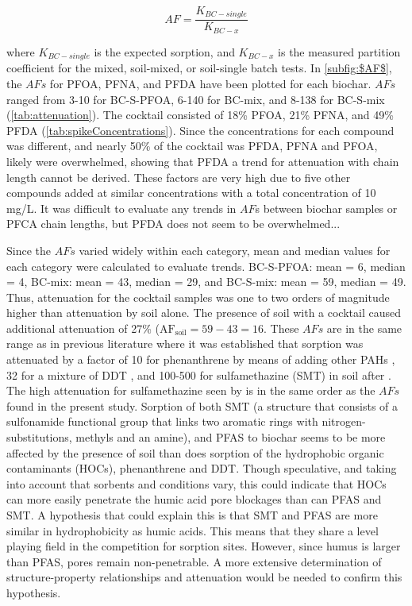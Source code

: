 \begin{equation} \label{eq:$AF$}
    AF = \frac{K_{BC-single}}{K_{BC-x}}
\end{equation}

where $K_{BC-single}$ is the expected sorption, and $K_{BC-x}$ is the measured partition coefficient for the mixed, soil-mixed, or soil-single batch tests. In \cref{subfig:$AF$}, the $AFs$ for PFOA, PFNA, and PFDA have been plotted for each biochar. $AFs$ ranged from 3-10 for BC-S-PFOA, 6-140 for BC-mix, and 8-138 for BC-S-mix (\cref{tab:attenuation}). The cocktail consisted of 18\% PFOA, 21\% PFNA, and 49\% PFDA (\cref{tab:spikeConcentrations}). Since the concentrations for each compound was different, and nearly 50\% of the cocktail was PFDA, PFNA and PFOA, likely were overwhelmed, showing that PFDA  a trend for attenuation with chain length cannot be derived. These factors are very high due to five other compounds added at similar concentrations with a total concentration of 10 mg/L. It was difficult to evaluate any trends in $AF$s between biochar samples or PFCA chain lengths, but PFDA does not seem to be overwhelmed... 

Since the $AFs$ varied widely within each category, mean and median values for each category were calculated to evaluate trends. BC-S-PFOA: mean = 6, median = 4, BC-mix: mean = 43, median = 29, and BC-S-mix: mean = 59, median = 49. Thus, attenuation for the cocktail samples was one to two orders of magnitude higher than attenuation by soil alone. The presence of soil with a cocktail caused additional attenuation of 27\% ($\mathrm{AF_{soil} = 59-43 = 16}$. These $AFs$ are in the same range as in previous literature where it was established that sorption was attenuated by a factor of 10 for phenanthrene by means of adding other PAHs \citep{Cornelissen2006}, 32 for a mixture of DDT \citep{hale2009sorption}, and 100-500 for sulfamethazine (SMT) in soil after \cite{Teixido2013}. The high attenuation for sulfamethazine seen by \cite{Teixido2013} is in the same order as the $AFs$ found in the present study. Sorption of both SMT (a structure  that consists of a sulfonamide functional group that links two aromatic rings with nitrogen-substitutions, methyls and an amine), and PFAS to biochar seems to be more affected by the presence of soil than does sorption of the hydrophobic organic contaminants (HOCs), phenanthrene and DDT. Though speculative, and taking into account that sorbents and conditions vary, this could indicate that HOCs can more easily penetrate the humic acid pore blockages than can PFAS and SMT. A hypothesis that could explain this is that SMT and PFAS are more similar in hydrophobicity as humic acids. This means that they share a level playing field in the competition for sorption sites. However, since humus is larger than PFAS, pores remain non-penetrable. A more extensive determination of structure-property relationships and attenuation would be needed to confirm this hypothesis. 

